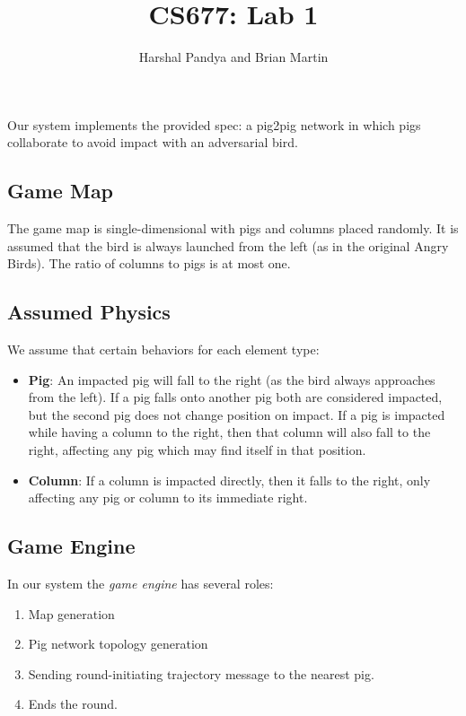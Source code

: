 \documentclass[]{article}
\title{CS677: Lab 1}
\author{Harshal Pandya and Brian Martin}
\date{}
\begin{document}
\maketitle

Our system implements the provided spec: a pig2pig network in which pigs
collaborate to avoid impact with an adversarial bird.

\subsection{Game Map}

The game map is single-dimensional with pigs and columns placed
randomly. It is assumed that the bird is always launched from the left
(as in the original Angry Birds). The ratio of columns to pigs is at
most one.

\subsection{Assumed Physics}

We assume that certain behaviors for each element type:

\begin{itemize}
\item
  \textbf{Pig}: An impacted pig will fall to the right (as the bird
  always approaches from the left). If a pig falls onto another pig both
  are considered impacted, but the second pig does not change position
  on impact. If a pig is impacted while having a column to the right,
  then that column will also fall to the right, affecting any pig which
  may find itself in that position.
\item
  \textbf{Column}: If a column is impacted directly, then it falls to
  the right, only affecting any pig or column to its immediate right.
\end{itemize}

\subsection{Game Engine}

In our system the \emph{game engine} has several roles:

\begin{enumerate}[1.]
\item
  Map generation
\item
  Pig network topology generation
\item
  Sending round-initiating trajectory message to the nearest pig.
\item
  Ends the round.
\end{enumerate}
\end{document}
